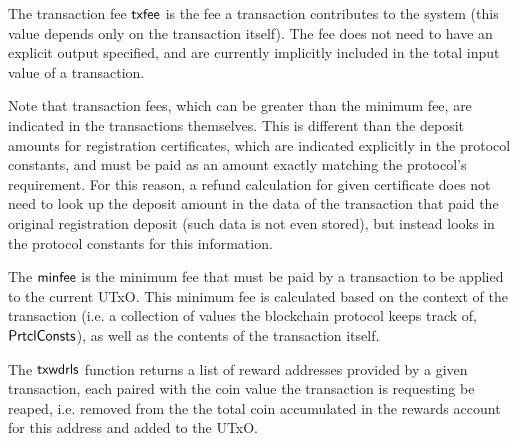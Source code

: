 \documentclass[11pt,a4paper,dvipsnames]{article}
\newcommand{\PrtclConsts}{\type{PrtclConsts}}
\theoremstyle{definition}
\theoremstyle{definition}
\begin{document}
The transaction fee $\mathsf{txfee}$ is the
fee a transaction contributes to the system (this value depends only on
the transaction itself). The fee does not need to have an explicit output
specified, and are currently implicitly included in the total input value of
a transaction.

Note that transaction fees, which can be greater than the minimum fee, are
indicated in the transactions themselves. This is different than
the deposit amounts for registration certificates, which are
indicated explicitly in the protocol constants,
and must be paid as an amount exactly matching the protocol's requirement.
For this reason, a refund calculation for given certificate does not need to look up the deposit
amount in the data of the transaction
that paid the original registration deposit (such data is not even stored),
but instead looks in the protocol
constants for this information.

The $\mathsf{minfee}$ is the minimum
fee that must be paid by a transaction to be applied to the current UTxO.
This minimum fee
is calculated based on the context of the transaction (i.e. a collection of
values the blockchain protocol keeps track of, $\PrtclConsts$), as well as
the contents of the transaction itself.

The $\mathsf{txwdrls}$ function returns a list of reward addresses provided by a
given transaction, each paired with the coin value the transaction is requesting
be reaped, i.e. removed from the the total coin accumulated in the rewards
account for this address and added to the UTxO.
\end{document}
